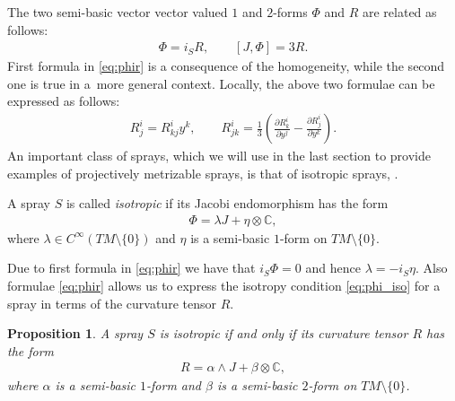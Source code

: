 \documentclass[pdftex]{sigma}
\numberwithin{equation}{section}
\newtheorem{Proposition}[Theorem]{Proposition}
{\theoremstyle{definition}
\newtheorem{Remark}[Theorem]{Remark}
\newtheorem{Definition}[Theorem]{Definition}
}
\begin{document}
The two semi-basic vector vector valued $1$ and $2$-forms $\Phi$ and
$R$ are related as follows:
\begin{gather}
\Phi=i_SR, \qquad [J,\Phi]=3R. \label{eq:phir} \end{gather}
First formula in \eqref{eq:phir} is a consequence of the homogeneity,
while the second one is true in a~more general context. Locally, the
above two formulae can be expressed as follows:
\begin{gather*}
R^i_j=R^i_{kj}y^k, \qquad R^i_{jk}=\frac{1}{3}\left(\frac{\partial
    R^i_k}{\partial y^j}-\frac{\partial R^i_j}{\partial
    y^k}\right).%
    \end{gather*}
An important class of sprays, which we will use in the last section to
provide examples of projectively metrizable sprays, is that of
isotropic sprays, \cite[Def\/inition~3.29]{grifone00}.
\begin{Definition} A spray $S$ is called \emph{isotropic} if its Jacobi
  endomorphism has the form
\begin{gather}
\Phi=\lambda J + \eta \otimes \mathbb{C}, \label{eq:phi_iso}
\end{gather}
where $\lambda\in C^{\infty}(TM\setminus\{0\})$ and $\eta$ is a
semi-basic $1$-form on $TM\setminus\{0\}$.
\end{Definition}
Due to f\/irst formula in \eqref{eq:phir} we have that $i_S\Phi=0$ and
hence $\lambda=-i_S\eta$. Also formulae \eqref{eq:phir} allows us to express
the isotropy condition \eqref{eq:phi_iso} for a spray in terms of the curvature tensor
$R$.
\begin{Proposition} \label{prop:iso}
A spray $S$ is isotropic if and only if its curvature tensor $R$ has the form
\begin{gather}
R=\alpha\wedge J + \beta \otimes \mathbb{C}, \label{eq:r_iso}
\end{gather}
where $\alpha$ is a semi-basic $1$-form and $\beta$ is a semi-basic
$2$-form on $TM\setminus\{0\}$. \end{Proposition}
\end{document}
